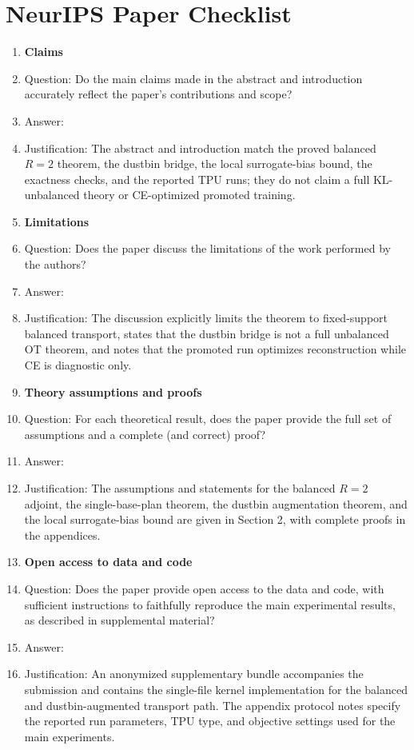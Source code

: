 \section*{NeurIPS Paper Checklist}

\begin{enumerate}

\item {\bf Claims}
    \item[] Question: Do the main claims made in the abstract and introduction accurately reflect the paper's contributions and scope?
    \item[] Answer: \answerYes{}
    \item[] Justification: The abstract and introduction match the proved balanced $R=2$ theorem, the dustbin bridge, the local surrogate-bias bound, the exactness checks, and the reported TPU runs; they do not claim a full KL-unbalanced theory or CE-optimized promoted training.

\item {\bf Limitations}
    \item[] Question: Does the paper discuss the limitations of the work performed by the authors?
    \item[] Answer: \answerYes{}
    \item[] Justification: The discussion explicitly limits the theorem to fixed-support balanced transport, states that the dustbin bridge is not a full unbalanced OT theorem, and notes that the promoted run optimizes reconstruction while CE is diagnostic only.

\item {\bf Theory assumptions and proofs}
    \item[] Question: For each theoretical result, does the paper provide the full set of assumptions and a complete (and correct) proof?
    \item[] Answer: \answerYes{}
    \item[] Justification: The assumptions and statements for the balanced $R=2$ adjoint, the single-base-plan theorem, the dustbin augmentation theorem, and the local surrogate-bias bound are given in Section 2, with complete proofs in the appendices.

\item {\bf Open access to data and code}
    \item[] Question: Does the paper provide open access to the data and code, with sufficient instructions to faithfully reproduce the main experimental results, as described in supplemental material?
    \item[] Answer: \answerYes{}
    \item[] Justification: An anonymized supplementary bundle accompanies the submission and contains the single-file kernel implementation for the balanced and dustbin-augmented transport path. The appendix protocol notes specify the reported run parameters, TPU type, and objective settings used for the main experiments.


\end{enumerate}
